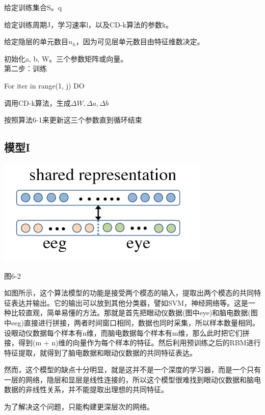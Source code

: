 		\qquad 给定训练集合S。q
		
		\qquad 给定训练周期J，学习速率l，以及CD-k算法的参数k。
		
		\qquad 给定隐层的单元数目$n_h$，因为可见层单元数目由特征维数决定。
		
		\qquad 初始化a, b, W。三个参数矩阵或向量。\\
	第二步：训练
		
		\qquad For iter in range(1, j) DO
		
		\qquad \qquad 调用CD-k算法，生成$\Delta W, \Delta a, \Delta b$
		
		\qquad \qquad 按照算法6-1来更新这三个参数直到循环结束
		
	\subsection{模型I}
		\centerline{\includegraphics[width=4in]{figure/model1.png}} 
		\centerline{图6-2}
	
	如图所示，这个算法模型的功能是接受两个模态的输入，提取出两个模态的共同特征表达并输出。它的输出可以放到其他分类器，譬如SVM，神经网络等。这是一种比较直观，简单易懂的方法。那就是首先把眼动仪数据(图中eye)和脑电数据(图中eeg)直接进行拼接，两者时间窗口相同，数据也同时采集，所以样本数量相同。设眼动仪数据每个样本有n维，而脑电数据每个样本有m维，那么此时把它们拼接，得到(m + n)维的向量作为每个样本的特征。然后利用预训练之后的RBM进行特征提取，就得到了脑电数据和眼动仪数据的共同特征表达。
	
	然而，这个模型的缺点十分明显，就是这并不是一个深度的学习器，而是一个只有一层的网络，隐层和显层是线性连接的，所以这个模型很难找到眼动仪数据和脑电数据的非线性关系，并不能提取出理想的共同特征。
	
	为了解决这个问题，只能构建更深层次的网络。	
